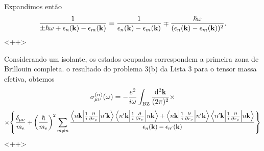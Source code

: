 \documentclass[a4paper,10pt]{article}
\begin{document}
Expandimos então
$$
\frac{1}{\pm \hbar \omega + \epsilon_n(\vb{k}) - \epsilon_m(\vb{k})} =
\frac{1}{\epsilon_n(\vb{k}) - \epsilon_m(\vb{k})}
\mp \frac{\hbar\omega}{(\epsilon_n(\vb{k}) - \epsilon_m(\vb{k}))^2}.
$$
<++>

Considerando um isolante, os estados ocupados correspondem a primeira zona de Brillouin completa. o resultado do problema 3(b) da Lista 3 para o tensor massa efetiva, obtemos
$$
\sigma^{(n)}_{\mu\nu}(\omega) = -\frac{e^2}{i\omega} \int_{\text{BZ}} \frac{\dd[2]{\vb{k}}}{(2\pi)^2} \times
$$
$$
\times \qty{
\frac{\delta_{\mu\nu}}{m_e} +
\qty(\frac{\hbar}{m_e})^2
\sum_{m\neq n}
\frac{
\mel**{n\vb{k}}{\frac{1}{i}\pdv{r_\mu}}{n'\vb{k}} \mel**{n'\vb{k}}{\frac{1}{i}\pdv{r_\nu}}{n\vb{k}} +
\mel**{n\vb{k}}{\frac{1}{i}\pdv{r_\nu}}{n'\vb{k}} \mel**{n'\vb{k}}{\frac{1}{i}\pdv{r_\mu}}{n\vb{k}}
}{\epsilon_n(\vb{k}) - \epsilon_{n'}(\vb{k})}
}
$$
<++>
\end{document}
